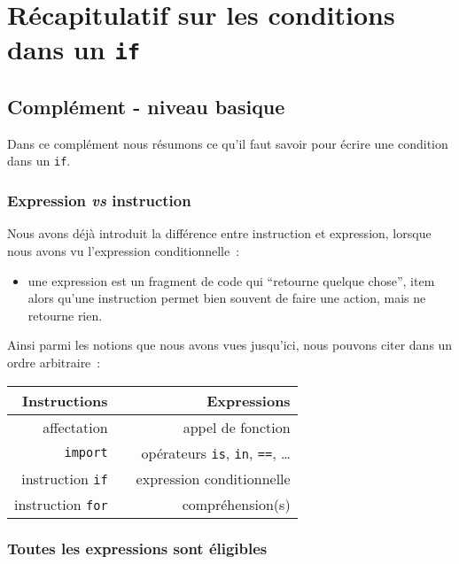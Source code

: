     \hypertarget{ruxe9capitulatif-sur-les-conditions-dans-un-if}{%
\section{\texorpdfstring{Récapitulatif sur les conditions dans un
\texttt{if}}{Récapitulatif sur les conditions dans un if}}\label{ruxe9capitulatif-sur-les-conditions-dans-un-if}}

    \hypertarget{compluxe9ment---niveau-basique}{%
\subsection{Complément - niveau
basique}\label{compluxe9ment---niveau-basique}}

    Dans ce complément nous résumons ce qu'il faut savoir pour écrire une
condition dans un \texttt{if}.

    \hypertarget{expression-vs-instruction}{%
\subsubsection{\texorpdfstring{Expression \emph{vs}
instruction}{Expression vs instruction}}\label{expression-vs-instruction}}

    Nous avons déjà introduit la différence entre instruction et expression,
lorsque nous avons vu l'expression conditionnelle~:

\begin{itemize}
	\item 
	une expression est un fragment de code qui ``retourne quelque chose'',
	item
	alors qu'une instruction permet bien souvent de faire une action, mais ne retourne
	rien.
\end{itemize}

    Ainsi parmi les notions que nous avons vues jusqu'ici, nous pouvons
citer dans un ordre arbitraire~:

\begin{longtable}[]{@{}rlr@{}}
\toprule
Instructions & & Expressions\tabularnewline
\midrule
\endhead
affectation & & appel de fonction\tabularnewline
\texttt{import} & & opérateurs \texttt{is}, \texttt{in}, \texttt{==},
\ldots{}\tabularnewline
instruction \texttt{if} & & expression conditionnelle\tabularnewline
instruction \texttt{for} & & compréhension(s)\tabularnewline
\bottomrule
\end{longtable}

    \hypertarget{toutes-les-expressions-sont-uxe9ligibles}{%
\subsubsection{Toutes les expressions sont
éligibles}\label{toutes-les-expressions-sont-uxe9ligibles}}

